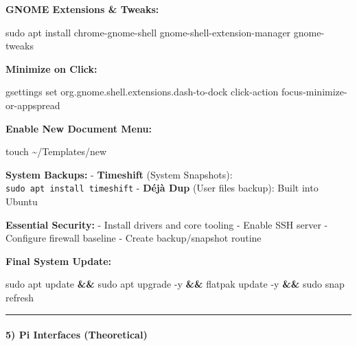\documentclass[
  english,
  paper=a4,
  oneside  ,captions=tableheading
]{scrartcl}
\newenvironment{Shaded}{}{}
\newcommand{\AttributeTok}[1]{\textcolor[rgb]{0.49,0.56,0.16}{#1}}
\newcommand{\ExtensionTok}[1]{#1}
\newcommand{\FunctionTok}[1]{\textcolor[rgb]{0.02,0.16,0.49}{#1}}
\newcommand{\KeywordTok}[1]{\textcolor[rgb]{0.00,0.44,0.13}{\textbf{#1}}}
\newcommand{\NormalTok}[1]{#1}
\newcommand{\StringTok}[1]{\textcolor[rgb]{0.25,0.44,0.63}{#1}}
\begin{document}
\textbf{GNOME Extensions \& Tweaks:}

\begin{Shaded}
\begin{Highlighting}[]
\FunctionTok{sudo}\NormalTok{ apt install chrome{-}gnome{-}shell gnome{-}shell{-}extension{-}manager gnome{-}tweaks}
\end{Highlighting}
\end{Shaded}

\textbf{Minimize on Click:}

\begin{Shaded}
\begin{Highlighting}[]
\ExtensionTok{gsettings}\NormalTok{ set org.gnome.shell.extensions.dash{-}to{-}dock click{-}action }\StringTok{\textquotesingle{}focus{-}minimize{-}or{-}appspread\textquotesingle{}}
\end{Highlighting}
\end{Shaded}

\textbf{Enable New Document Menu:}

\begin{Shaded}
\begin{Highlighting}[]
\FunctionTok{touch}\NormalTok{ \textasciitilde{}/Templates/new}
\end{Highlighting}
\end{Shaded}

\textbf{System Backups:} - \textbf{Timeshift} (System Snapshots):
\texttt{sudo\ apt\ install\ timeshift} - \textbf{Déjà Dup} (User files
backup): Built into Ubuntu

\textbf{Essential Security:} - Install drivers and core tooling - Enable
SSH server - Configure firewall baseline - Create backup/snapshot
routine

\textbf{Final System Update:}

\begin{Shaded}
\begin{Highlighting}[]
\FunctionTok{sudo}\NormalTok{ apt update }\KeywordTok{\&\&} \FunctionTok{sudo}\NormalTok{ apt upgrade }\AttributeTok{{-}y} \KeywordTok{\&\&} \ExtensionTok{flatpak}\NormalTok{ update }\AttributeTok{{-}y} \KeywordTok{\&\&} \FunctionTok{sudo}\NormalTok{ snap refresh}
\end{Highlighting}
\end{Shaded}

\begin{center}\rule{0.5\linewidth}{0.5pt}\end{center}

\paragraph{5) Pi Interfaces
(Theoretical)}\label{pi-interfaces-theoretical}
\end{document}
